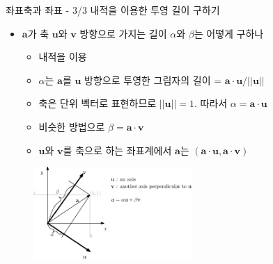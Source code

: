 \documentclass{beamer}
\begin{document}
\begin{frame}{좌표축과 좌표 - 3/3 내적을 이용한 투영 길이 구하기}

\begin{itemize}
\item $\mathbf a$가 축 $\mathbf u$와 $\mathbf v$ 방향으로 가지는 길이 $\alpha$와 $\beta$는 어떻게 구하나
	\begin{itemize}
	\item 내적을 이용
	\item $\alpha$는 $\mathbf a$를 $\mathbf u$ 방향으로 투영한 그림자의 길이 =  $\mathbf a \cdot \mathbf u / || \mathbf u ||$
	\item 축은 단위 벡터로 표현하므로 $||\mathbf u||=1$. 따라서 $\alpha = \mathbf a \cdot \mathbf u$
	\item 비슷한 방법으로 $\beta = \mathbf a \cdot \mathbf v$
	\item $\mathbf u$와 $\mathbf v$를 축으로 하는 좌표계에서 $\mathbf a$는 $(\mathbf a \cdot \mathbf u, \mathbf a \cdot \mathbf v)$
	\end{itemize}
\end{itemize}

\begin{figure}
\includegraphics[width=6cm]{Math_vector/vectorComponentsArb.eps}
\end{figure}

\end{frame}
\end{document}

